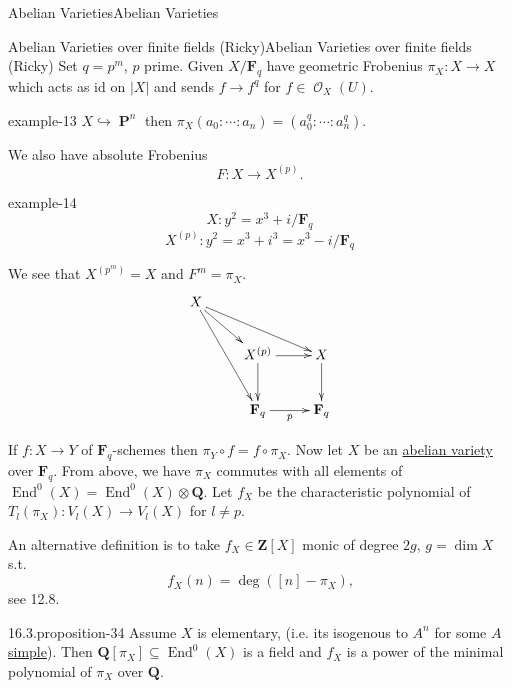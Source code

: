 \documentclass[10pt,]{book}
\numberwithin{equation}{section}
\newcommand{\sheaf}[1]{\operatorname{\mathcal{#1}}}
\newcommand{\lb}{[}
\newcommand{\rb}{]}
\newcommand{\ZZ}{\mathbf{Z}}
\newcommand{\QQ}{\mathbf{Q}}
\newcommand{\FF}{\mathbf{F}}
\newcommand{\id}{\mathrm{id}}
\DeclareMathOperator{\End}{End}
\DeclareMathOperator{\PP}{\mathbf{P}}
\begin{document}
\begin{chapterptx}{Abelian Varieties}{}{Abelian Varieties}{}{}
\begin{sectionptx}{Abelian Varieties over finite fields (Ricky)}{}{Abelian Varieties over finite fields (Ricky)}{}{}
\hypertarget{p-356}{}%
Set \(q = p^m\), \(p\) prime. Given \(X/\FF_q\) have  geometric Frobenius \(\pi_X\colon X \to X\) which acts as \(\id\) on \(|X|\) and sends \(f\to f^q\) for \(f\in \sheaf O_X(U)\).%
\begin{example}{}{example-13}%
\hypertarget{p-357}{}%
\(X \hookrightarrow \PP^n\) then \(\pi_X(a_0:\cdots :a_n) = (a_0^q : \cdots :a_n^q)\).%
\end{example}
\hypertarget{p-358}{}%
We also have absolute Frobenius%
\begin{equation*}
F\colon X\to X^{(p)}\text{.}
\end{equation*}
%
\begin{example}{}{example-14}%
\hypertarget{p-359}{}%
%
\begin{equation*}
X \colon y^2 = x^3 + i / \FF_q
\end{equation*}
%
\begin{equation*}
X^{(p)} \colon y^2 = x^3 + i^3 = x^3 - i / \FF_q
\end{equation*}
%
\end{example}
\hypertarget{p-360}{}%
We see that \(X^{(p^m)} = X\) and \(F^m = \pi_X\).%
\begin{equation*}
\xymatrix{
X \ar[drr] \ar[dr]\ar[ddr] & &\\
& X^{(p)} \ar[d]\ar[r] & X\ar[d]\\
& \FF_q \ar[r]_p &\FF_q
}
\end{equation*}
%
\par
\hypertarget{p-361}{}%
If \(f\colon X \to Y\) of \(\FF_q\)-schemes then \(\pi_Y \circ f = f\circ \pi_X\). Now let \(X\) be an \hyperref[def-buntes-abvar]{abelian variety} over \(\FF_q\). From above, we have \(\pi_X\) commutes with all elements of \(\End^0(X) = \End^0(X)\otimes \QQ\). Let \(f_X\) be the characteristic polynomial of \(T_l(\pi_X) \colon V_l(X) \to V_l(X)\) for \(l \ne p\).%
\par
\hypertarget{p-362}{}%
An alternative definition is to take \(f_X\in \ZZ\lb X\rb\) monic of degree \(2g \), \(g = \dim X\) s.t.%
\begin{equation*}
f_X(n) = \deg([n] -\pi_X)\text{,}
\end{equation*}
see 12.8.%
\begin{proposition}{16.3.}{}{proposition-34}%
\hypertarget{p-363}{}%
Assume \(X\) is elementary, (i.e. its isogenous to \(A^n\) for some \(A\) \hyperref[def-simple-av]{simple}). Then  \(\QQ\lb \pi_X\rb\subseteq \End^0(X)\) is a field and \(f_X\) is a power of the minimal polynomial of \(\pi_X\) over \(\QQ\).%

\end{proposition}
\end{sectionptx}
\end{chapterptx}
\end{document}
